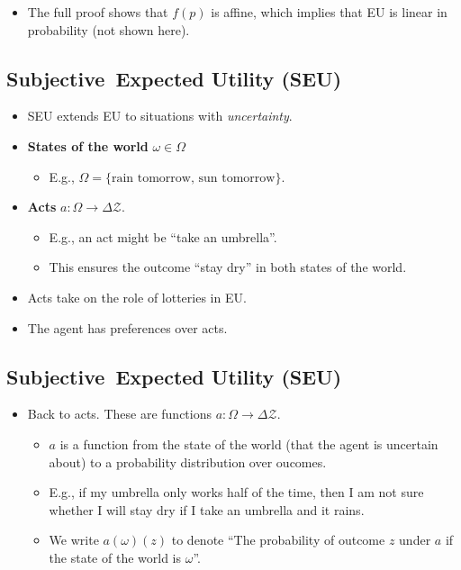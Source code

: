 \documentclass[
  letterpaper,
  DIV=11,
  numbers=noendperiod]{scrartcl}
\providecommand{\tightlist}{%
  \setlength{\itemsep}{0pt}\setlength{\parskip}{0pt}}\usepackage{longtable,booktabs,array}
\begin{document}
\begin{itemize}
\tightlist
\item
  The full proof shows that \(f(p)\) is affine, which implies that EU is
  linear in probability (not shown here).
\end{itemize}

\subsection{Subjective~Expected Utility
(SEU)}\label{subjective-expected-utility-seu}

\begin{itemize}
\tightlist
\item
  SEU extends EU to situations with \emph{uncertainty}.
\item
  \textbf{States of the world} \(\omega\in\Omega\)

  \begin{itemize}
  \tightlist
  \item
    E.g., \(\Omega = \{\text{rain tomorrow, sun tomorrow}\}\).
  \end{itemize}
\item
  \textbf{Acts} \(a:\Omega\to\Delta\mathcal{Z}\).

  \begin{itemize}
  \tightlist
  \item
    E.g., an act might be ``take an umbrella''.
  \item
    This ensures the outcome ``stay dry'' in both states of the world.
  \end{itemize}
\item
  Acts take on the role of lotteries in EU.
\item
  The agent has preferences over acts.
\end{itemize}

\subsection{Subjective~Expected Utility
(SEU)}\label{subjective-expected-utility-seu-1}

\begin{itemize}
\tightlist
\item
  Back to acts. These are functions \(a:\Omega\to\Delta\mathcal{Z}\).

  \begin{itemize}
  \tightlist
  \item
    \(a\) is a function from the state of the world (that the agent is
    uncertain about) to a probability distribution over oucomes.
  \item
    E.g., if my umbrella only works half of the time, then I am not sure
    whether I will stay dry if I take an umbrella and it rains.
  \item
    We write \(a(\omega)(z)\) to denote ``The probability of outcome
    \(z\) under \(a\) if the state of the world is \(\omega\)''.
  \end{itemize}
\end{itemize}
\end{document}
